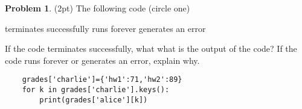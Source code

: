 \documentclass[10pt]{article}
\theoremstyle{definition}
\newtheorem{problem}{Problem}
\begin{document}
\begin{problem}
    (2pt)
    The following code (circle one)
    
    \vspace{0.25in}
    \hspace{0.5in}terminates successfully
    \hspace{1in}runs forever
    \hspace{1in}generates an error
    \vspace{0.25in}

    \noindent
    If the code terminates successfully, what what is the output of the code?
    If the code runs forever or generates an error, explain why.
\end{problem}
\begin{lstlisting}
    grades['charlie']={'hw1':71,'hw2':89}
    for k in grades['charlie'].keys():
        print(grades['alice'][k])
\end{lstlisting}
\vspace{1.5in}
\end{document}
